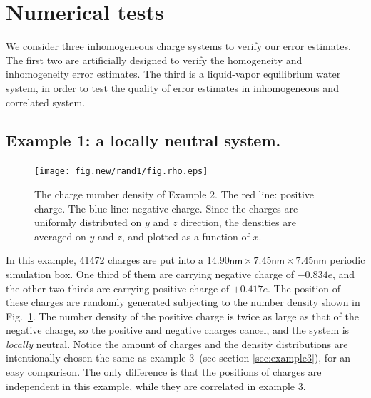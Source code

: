 \documentclass[aps,pre,preprint]{revtex4}
\begin{document}
\section{Numerical tests}\label{sec:tmp3}

We consider three inhomogeneous charge systems to verify our error
estimates.
The first two are artificially designed to verify the 
homogeneity and inhomogeneity error estimates. The third is a 
liquid-vapor equilibrium water system, in order to test the
quality  of error estimates in inhomogeneous and correlated system.  


\subsection{Example 1: a locally neutral system.}
\label{sec:example1}

\begin{figure}
  \centering
  \texttt{[image: fig.new/rand1/fig.rho.eps]}
  \caption{
    The charge number density  of Example 2.
    The red line: positive charge. The blue line: negative charge.
    Since the charges are uniformly distributed
    on $y$ and $z$ direction, the densities are averaged on $y$ and $z$,
    and plotted as a
    function of $x$.
  }
  \label{fig:tmp-rho1}
\end{figure}

In this example,  41472 charges are put into a
$14.90\textsf{nm}\times 7.45\textsf{nm}\times 7.45\textsf{nm}$
periodic simulation box. One third of
them are carrying negative charge of $-0.834e$, and the other two thirds
are carrying positive charge of $+0.417e$.
The position of these charges
are randomly generated subjecting to the number density shown in
Fig.~\ref{fig:tmp-rho1}.  The number density of the  positive
charge   is twice as large as that of the negative charge,
so the
positive and negative charges cancel, and the
system is \emph{locally} neutral. Notice the amount of charges
and the density distributions are intentionally chosen the same as
example 3~(see section \ref{sec:example3}), 
for an easy comparison.  The only difference is that the positions
of charges are independent  in this example,
while they are correlated in example 3.
\end{document}
